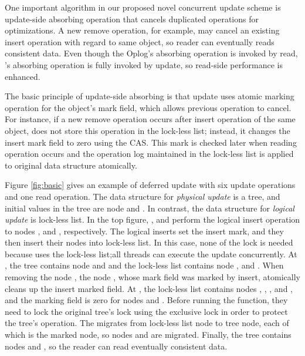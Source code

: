 One important algorithm in our proposed novel concurrent update scheme is
update-side absorbing operation that cancels duplicated operations for optimizations.
A new remove operation, for example, may cancel an existing insert operation
with regard to same object, so reader can eventually reads consistent data.
Even though the Oplog's absorbing operation is invoked by
read, 's absorbing operation is fully invoked by update, so read-side
performance is enhanced.

The basic principle of update-side absorbing is that update uses atomic 
marking operation for the object's mark field, which allows previous operation to cancel.
For instance, if a new remove operation occurs after insert operation of the
same object,  does not store this operation in the lock-less
list; instead, it changes the insert mark field to zero using the CAS.
This mark is checked later when reading operation occurs and the operation log 
maintained in the lock-less list is applied to original data structure atomically.

Figure \ref{fig:basic} gives an example of deferred update with six update
operations and one read operation.
The data structure for \emph{physical update} is a tree, and initial values in
the tree are node  and .
In contrast, the data structure for \emph{logical update} is lock-less list.
In the top figure, ,  and  perform the
logical insert operation to nodes ,  and , respectively.
The logical inserts set the insert mark, and they then insert their
nodes into lock-less list.
In this case, none of the lock is needed because  uses the lock-less
list;all threads can execute the update concurrently.
At , the tree contains node 
and  and 
the lock-less list contains node ,  and .
When removing the node , the node , whose mark field was marked
by insert, atomically cleans up the insert marked field.
At , the lock-less list contains nodes
, , , and , and the marking field is zero for 
nodes  and .
Before running the  function, they need to lock the original tree's
lock using the exclusive lock in order to protect the tree's operation.
The  migrates from lock-less list node to tree node, each of 
which is the marked node, so nodes  and  are migrated.
Finally, the tree contains nodes  and , so the reader can read eventually consistent data.

